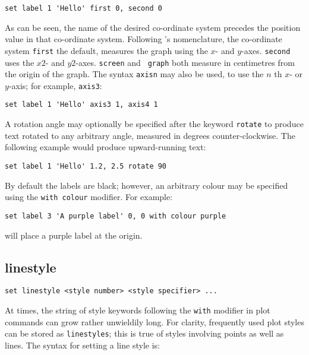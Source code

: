 \begin{verbatim}
set label 1 'Hello' first 0, second 0
\end{verbatim}

As can be seen, the name of the desired co-ordinate system precedes the position
value in that co-ordinate system. Following \gnuplot's nomenclature, the
co-ordinate system {\tt first} the default, measures the graph using the $x$- and
$y$-axes. {\tt second} uses the $x2$- and $y2$-axes.  {\tt screen} and {\tt
graph} both measure in centimetres from the origin of the graph.  The syntax
{\tt axisn} may also be used, to use the $n$ th $x$- or $y$-axis; for example,
{\tt axis3}:

\begin{verbatim}
set label 1 'Hello' axis3 1, axis4 1
\end{verbatim}

A rotation angle may optionally be specified after the keyword {\tt rotate}
to produce text rotated to any arbitrary angle, measured in degrees
counter-clockwise. The following example would produce upward-running text:

\begin{verbatim}
set label 1 'Hello' 1.2, 2.5 rotate 90
\end{verbatim}

By default the labels are black; however, an arbitrary colour may be specified
using the {\tt with colour} modifier.  For example:

\begin{verbatim}
set label 3 'A purple label' 0, 0 with colour purple
\end{verbatim}

\noindent will place a purple label at the origin.

\subsection{linestyle}

\begin{verbatim}
set linestyle <style number> <style specifier> ...
\end{verbatim}

At times, the string of style keywords following the {\tt with} modifier in plot
commands can grow rather unwieldily long. For clarity, frequently used plot
styles can be stored as {\tt linestyles}; this is true of styles involving
points as well as lines. The syntax for setting a line style is:

